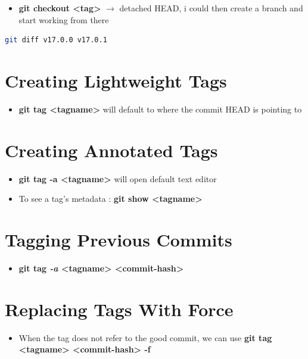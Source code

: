 \documentclass{report}
\begin{document}
\begin{itemize}
	\item \textbf{git checkout <tag>} $\rightarrow$ detached HEAD, i could then create a branch and start working from there
\end{itemize}

\begin{tcolorbox}[title=Diffing between two tags,colback=backcolour]
\begin{lstlisting}[language=bash]
git diff v17.0.0 v17.0.1
\end{lstlisting}
\end{tcolorbox}

\section{Creating Lightweight Tags}

\begin{itemize}
	\item \textbf{git tag <tagname>} will default to where the commit HEAD is pointing to
\end{itemize}

\section{Creating Annotated Tags}

\begin{itemize}
	\item \textbf{git tag -a <tagname>} will open default text editor 
	\item To see a tag's metadata : \textbf{git show <tagname>} 
\end{itemize}


\section{Tagging Previous Commits}

\begin{itemize}
	\item \textbf{git tag \textit{-a} <tagname> <commit-hash>} 
\end{itemize}

\section{Replacing Tags With Force}

\begin{itemize}
	\item When the tag does not refer to the good commit, we can use \textbf{git tag <tagname> <commit-hash> -f} 
\end{itemize}
\end{document}
